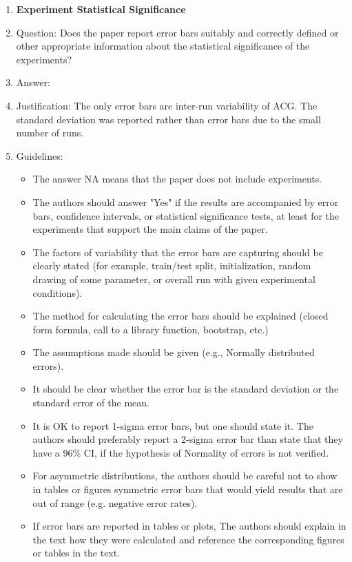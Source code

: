 \documentclass{article}
\begin{document}
\begin{enumerate}
\item {\bf Experiment Statistical Significance}
    \item[] Question: Does the paper report error bars suitably and correctly defined or other appropriate information about the statistical significance of the experiments?
    \item[] Answer: \answerYes{} %
    \item[] Justification: The only error bars are inter-run variability of ACG. The standard deviation was reported rather than error bars due to the small number of runs.
    \item[] Guidelines:
    \begin{itemize}
        \item The answer NA means that the paper does not include experiments.
        \item The authors should answer "Yes" if the results are accompanied by error bars, confidence intervals, or statistical significance tests, at least for the experiments that support the main claims of the paper.
        \item The factors of variability that the error bars are capturing should be clearly stated (for example, train/test split, initialization, random drawing of some parameter, or overall run with given experimental conditions).
        \item The method for calculating the error bars should be explained (closed form formula, call to a library function, bootstrap, etc.)
        \item The assumptions made should be given (e.g., Normally distributed errors).
        \item It should be clear whether the error bar is the standard deviation or the standard error of the mean.
        \item It is OK to report 1-sigma error bars, but one should state it. The authors should preferably report a 2-sigma error bar than state that they have a 96\% CI, if the hypothesis of Normality of errors is not verified.
        \item For asymmetric distributions, the authors should be careful not to show in tables or figures symmetric error bars that would yield results that are out of range (e.g. negative error rates).
        \item If error bars are reported in tables or plots, The authors should explain in the text how they were calculated and reference the corresponding figures or tables in the text.
    \end{itemize}


\end{enumerate}
\end{document}
